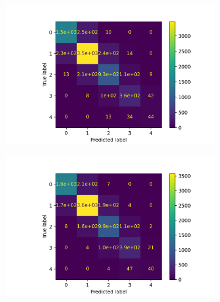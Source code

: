 \begin{figure}[H]
\centering

\begin{subfigure}{.49\textwidth}
  \centering
  \includegraphics[width=\linewidth]{decisionTreeConfusionMatrix.png} 
  \caption{}
  \label{subfig:decisionTree}
\end{subfigure}
\begin{subfigure}{.49\textwidth}
  \centering
  \includegraphics[width=\linewidth]{gradientBoostConfusionMatrix.png}  
  \caption{}
  \label{subfig:gradientBoost}
\end{subfigure}


\end{figure}
